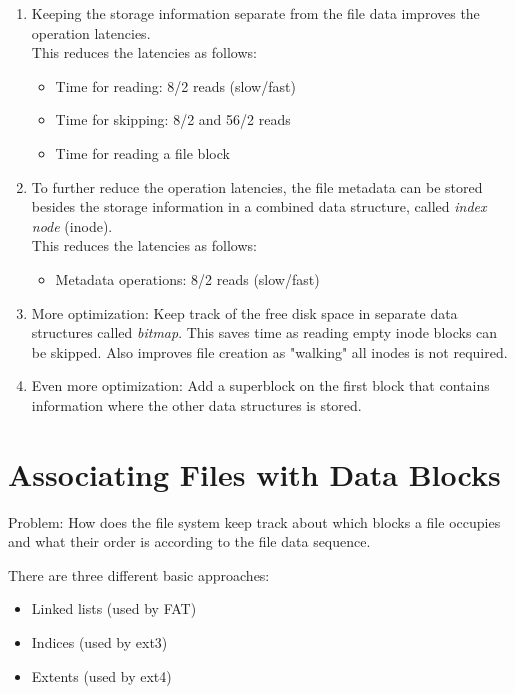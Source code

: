         \begin{enumerate}
        	\item Keeping the storage information separate from the file data improves the operation latencies. \\ This reduces the latencies as follows:
            	\begin{itemize}
            		\item Time for reading: 8/2 reads (slow/fast)
            		\item Time for skipping: 8/2 and 56/2 reads
            		\item Time for reading a file block
            	\end{itemize}
        	\item To further reduce the operation latencies, the file metadata can be stored besides the storage information in a combined data structure, called \textit{index node} (inode). \\ This reduces the latencies as follows:
            	\begin{itemize}
            		\item Metadata operations: 8/2 reads (slow/fast)
            	\end{itemize}
        	\item More optimization: Keep track of the free disk space in separate data structures called \textit{bitmap}. This saves time as reading empty inode blocks can be skipped. Also improves file creation as "walking" all inodes is not required.
        	\item Even more optimization: Add a superblock on the first block that contains information where the other data structures is stored.
        \end{enumerate}

    \section{Associating Files with Data Blocks}
        Problem: How does the file system keep track about which blocks a file occupies and what their order is according to the file data sequence.
        
        There are three different basic approaches:
        \begin{itemize}
        	\item Linked lists (used by FAT)
        	\item Indices (used by ext3)
        	\item Extents (used by ext4)
        \end{itemize}

